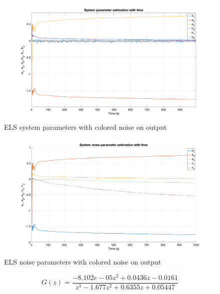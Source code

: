 \begin{figure}
	\centering
	\includegraphics[totalheight=8cm]{images/ELSISystemParam.png}
	\caption{ELS system parameters with colored noise on output}
	\label{fig:ELSISystemParam}
\end{figure}

\begin{figure}
	\centering
	\includegraphics[totalheight=8cm]{images/ELSINoiseParam.png}
	\caption{ELS noise parameters with colored noise on output}
	\label{fig:ELSINoiseParam}
\end{figure}

\begin{equation}
	G(z) =	\frac{ -8.102e-05 z^2 + 0.0436 z - 0.0161}{z^3 - 1.677 z^2 + 0.6355 z + 0.05447}
	\label{eq:ELSITransferFunction}
\end{equation}
